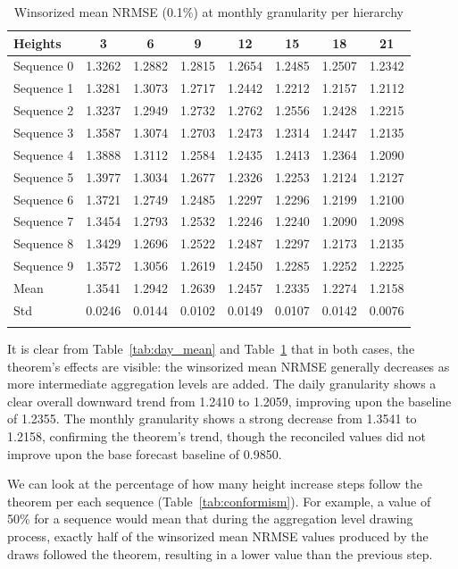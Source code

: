 \documentclass[sn-basic,Numbered,iicol]{sn-jnl}
\theoremstyle{thmstyleone}%
\theoremstyle{thmstyletwo}%
\theoremstyle{thmstylethree}%
\begin{document}
\begin{table}[h]
\caption{Winsorized mean NRMSE (0.1\%) at monthly granularity per hierarchy}\label{tab:month_mean}
\begin{tabular*}{\textwidth}{@{\extracolsep\fill}lccccccc}
\toprule
Heights & 3 & 6 & 9 & 12 & 15 & 18 & 21 \\
\midrule
Sequence 0 & 1.3262 & 1.2882 & 1.2815 & 1.2654 & 1.2485 & 1.2507 & 1.2342 \\
Sequence 1 & 1.3281 & 1.3073 & 1.2717 & 1.2442 & 1.2212 & 1.2157 & 1.2112 \\
Sequence 2 & 1.3237 & 1.2949 & 1.2732 & 1.2762 & 1.2556 & 1.2428 & 1.2215 \\
Sequence 3 & 1.3587 & 1.3074 & 1.2703 & 1.2473 & 1.2314 & 1.2447 & 1.2135 \\
Sequence 4 & 1.3888 & 1.3112 & 1.2584 & 1.2435 & 1.2413 & 1.2364 & 1.2090 \\
Sequence 5 & 1.3977 & 1.3034 & 1.2677 & 1.2326 & 1.2253 & 1.2124 & 1.2127 \\
Sequence 6 & 1.3721 & 1.2749 & 1.2485 & 1.2297 & 1.2296 & 1.2199 & 1.2100 \\
Sequence 7 & 1.3454 & 1.2793 & 1.2532 & 1.2246 & 1.2240 & 1.2090 & 1.2098 \\
Sequence 8 & 1.3429 & 1.2696 & 1.2522 & 1.2487 & 1.2297 & 1.2173 & 1.2135 \\
Sequence 9 & 1.3572 & 1.3056 & 1.2619 & 1.2450 & 1.2285 & 1.2252 & 1.2225 \\
\midrule
Mean & 1.3541 & 1.2942 & 1.2639 & 1.2457 & 1.2335 & 1.2274 & 1.2158 \\
Std & 0.0246 & 0.0144 & 0.0102 & 0.0149 & 0.0107 & 0.0142 & 0.0076 \\
\botrule
\end{tabular*}
\end{table}

It is clear from Table~\ref{tab:day_mean} and Table~\ref{tab:month_mean} that in both cases, the theorem's effects are visible: the winsorized mean NRMSE generally decreases as more intermediate aggregation levels are added. The daily granularity shows a clear overall downward trend from 1.2410 to 1.2059, improving upon the baseline of 1.2355. The monthly granularity shows a strong decrease from 1.3541 to 1.2158, confirming the theorem's trend, though the reconciled values did not improve upon the base forecast baseline of 0.9850.

We can look at the percentage of how many height increase steps follow the theorem per each sequence (Table~\ref{tab:conformism}). For example, a value of 50\% for a sequence would mean that during the aggregation level drawing process, exactly half of the winsorized mean NRMSE values produced by the draws followed the theorem, resulting in a lower value than the previous step.
\end{document}
